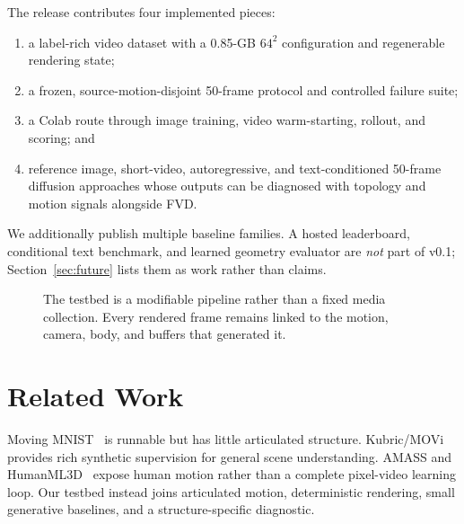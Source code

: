 \documentclass[10pt,twocolumn]{article}
\begin{document}
The release contributes four implemented pieces:
\begin{enumerate}
\item a label-rich video dataset with a 0.85-GB $64^2$ configuration and regenerable rendering state;
\item a frozen, source-motion-disjoint 50-frame protocol and controlled failure suite;
\item a Colab route through image training, video warm-starting, rollout, and scoring; and
\item reference image, short-video, autoregressive, and text-conditioned 50-frame diffusion approaches whose outputs can be diagnosed with
topology and motion signals alongside FVD.
\end{enumerate}
We additionally publish multiple baseline families. A hosted leaderboard, conditional text benchmark, and learned
geometry evaluator are \emph{not} part of v0.1; Section~\ref{sec:future} lists them as work rather than claims.

\begin{figure}[t]\centering
{}
\caption{The testbed is a modifiable pipeline rather than a fixed media collection. Every rendered frame remains linked
to the motion, camera, body, and buffers that generated it.}\label{fig:loop}
\end{figure}

\section{Related Work}
Moving MNIST~\cite{srivastava2015unsupervised} is runnable but has little articulated structure. Kubric/MOVi
~\cite{greff2022kubric} provides rich synthetic supervision for general scene understanding. AMASS and
HumanML3D~\cite{mahmood2019amass,guo2022humanml3d} expose human motion rather than a complete pixel-video learning
loop. Our testbed instead joins articulated motion, deterministic rendering, small generative baselines, and a
structure-specific diagnostic.
\end{document}
